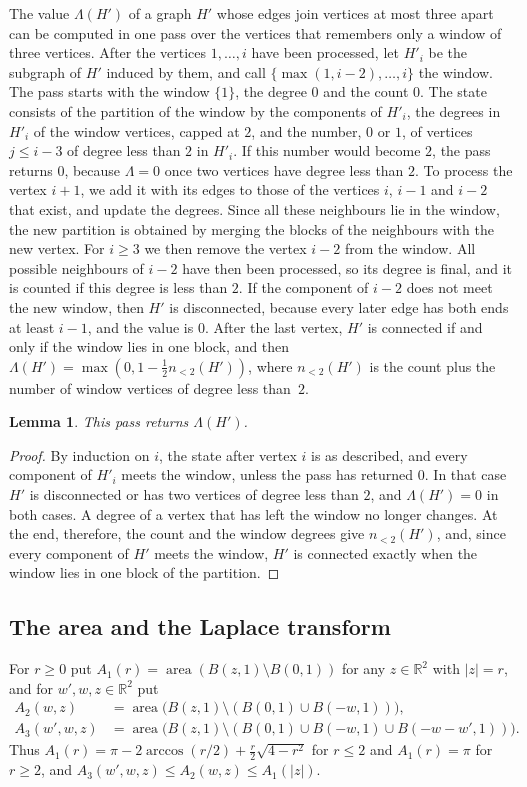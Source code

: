 \documentclass[11pt]{amsart}
\newtheorem{lemma}[theorem]{Lemma}
\theoremstyle{definition}
\theoremstyle{remark}
\numberwithin{equation}{section}
\newcommand{\R}{\mathbb{R}}
\newcommand{\area}{\operatorname{area}}
\begin{document}
The value $\Lambda(H')$ of a graph $H'$ whose edges join vertices at most three apart can be computed in one pass over the vertices that remembers only a window of three vertices. After the vertices $1,\dots,i$ have been processed, let $H'_i$ be the subgraph of $H'$ induced by them, and call $\{\max(1,i-2),\dots,i\}$ the window. The pass starts with the window $\{1\}$, the degree $0$ and the count $0$. The state consists of the partition of the window by the components of $H'_i$, the degrees in $H'_i$ of the window vertices, capped at $2$, and the number, $0$ or $1$, of vertices $j\le i-3$ of degree less than $2$ in $H'_i$. If this number would become $2$, the pass returns $0$, because $\Lambda=0$ once two vertices have degree less than $2$. To process the vertex $i+1$, we add it with its edges to those of the vertices $i$, $i-1$ and $i-2$ that exist, and update the degrees. Since all these neighbours lie in the window, the new partition is obtained by merging the blocks of the neighbours with the new vertex. For $i\ge3$ we then remove the vertex $i-2$ from the window. All possible neighbours of $i-2$ have then been processed, so its degree is final, and it is counted if this degree is less than $2$. If the component of $i-2$ does not meet the new window, then $H'$ is disconnected, because every later edge has both ends at least $i-1$, and the value is $0$. After the last vertex, $H'$ is connected if and only if the window lies in one block, and then $\Lambda(H')=\max(0,1-\frac12n_{<2}(H'))$, where $n_{<2}(H')$ is the count plus the number of window vertices of degree less than~$2$.

\begin{lemma}\label{lem:enc}
This pass returns $\Lambda(H')$.
\end{lemma}

\begin{proof}
By induction on $i$, the state after vertex $i$ is as described, and every component of $H'_i$ meets the window, unless the pass has returned $0$. In that case $H'$ is disconnected or has two vertices of degree less than $2$, and $\Lambda(H')=0$ in both cases. A degree of a vertex that has left the window no longer changes. At the end, therefore, the count and the window degrees give $n_{<2}(H')$, and, since every component of $H'$ meets the window, $H'$ is connected exactly when the window lies in one block of the partition.
\end{proof}

\subsection{The area and the Laplace transform}\label{sec:laplace}
For $r\ge0$ put $A_1(r)=\area(B(z,1)\setminus B(0,1))$ for any $z\in\R^2$ with $|z|=r$, and for $w',w,z\in\R^2$ put
\begin{align*}
A_2(w,z)&=\area\bigl(B(z,1)\setminus(B(0,1)\cup B(-w,1))\bigr),\\
A_3(w',w,z)&=\area\bigl(B(z,1)\setminus(B(0,1)\cup B(-w,1)\cup B(-w-w',1))\bigr).
\end{align*}
Thus $A_1(r)=\pi-2\arccos(r/2)+\frac r2\sqrt{4-r^2}$ for $r\le2$ and $A_1(r)=\pi$ for $r\ge2$, and $A_3(w',w,z)\le A_2(w,z)\le A_1(|z|)$.
\end{document}
